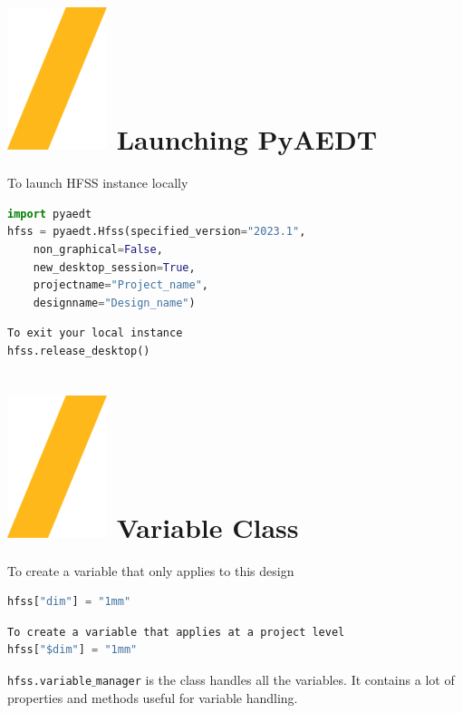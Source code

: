 \documentclass[9pt,landscape]{article}
\begin{document}
\begin{multicols}{3}
\setlength{\premulticols}{1pt}
\setlength{\postmulticols}{1pt}
\setlength{\multicolsep}{1pt}
\setlength{\columnsep}{2pt}

\section{\includegraphics[height=\fontcharht\font`\S]{slash.png} Launching PyAEDT}
To launch HFSS instance locally
\begin{lstlisting}[language=Python]
import pyaedt
hfss = pyaedt.Hfss(specified_version="2023.1",
	non_graphical=False,
	new_desktop_session=True,
	projectname="Project_name",
	designname="Design_name")
\end{lstlisting}
\begin{lstlisting}[language=Python]
To exit your local instance
hfss.release_desktop()
\end{lstlisting}



\section{\includegraphics[height=\fontcharht\font`\S]{slash.png} Variable Class}
To create a variable that only applies to this design
\begin{lstlisting}[language=Python]
hfss["dim"] = "1mm"
\end{lstlisting}
\begin{lstlisting}[language=Python]
To create a variable that applies at a project level
hfss["$dim"] = "1mm"
\end{lstlisting}
\texttt{hfss.variable$\_$manager} is the class handles all the variables. It contains a lot of properties and methods useful for variable handling.

\end{multicols}
\end{document}
